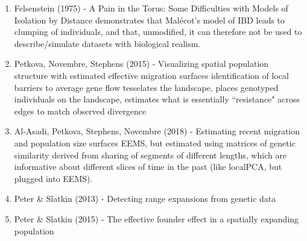 \documentclass[12pt]{article}
\begin{document}
\begin{enumerate}
\item Felsenstein (1975) - A Pain in the Torus: Some Difficulties with Models of Isolation by Distance
\subitem demonstrates that Mal\'{e}cot's model of IBD leads to clumping of individuals, 
and that, unmodified, it can therefore not be used to describe/simulate datasets with biological realism.

\item Petkova, Novembre, Stephens (2015) - Visualizing spatial population structure with estimated effective migration surfaces
\subitem identification of local barriers to average gene flow
\subitem tesselates the landscape, places genotyped individuals on the landscape, 
estimates what is essentially ``resistance" across edges to match observed divergence

\item Al-Asadi, Petkova, Stephens, Novembre (2018) - Estimating recent migration and population size surfaces
\subitem EEMS, but estimated using matrices of genetic similarity 
derived from sharing of segments of different lengths, 
which are informative about different slices of time in the past 
(like localPCA, but plugged into EEMS).

\item Peter \& Slatkin (2013) - Detecting range expansions from genetic data
\subitem 

\item Peter \& Slatkin (2015) - The effective founder effect in a spatially expanding population
\subitem 

\end{enumerate}
\end{document}
